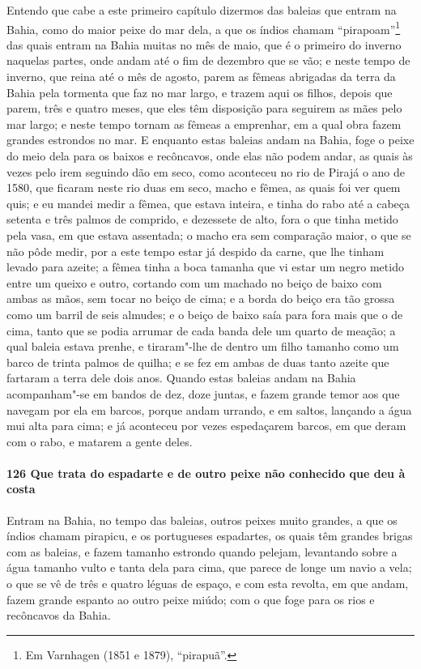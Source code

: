 Entendo que cabe a este primeiro capítulo dizermos das baleias que entram na Bahia, como
do maior peixe do mar dela, a que os índios chamam ``pirapoam''\footnote{ Em Varnhagen
(1851 e 1879), ``pirapuã''.} das quais entram na Bahia muitas no mês de maio, que é o
primeiro do inverno naquelas partes, onde andam até o fim de dezembro que se vão; e neste
tempo de inverno, que reina até o mês de agosto, parem as fêmeas abrigadas da terra da
Bahia pela tormenta que faz no mar largo, e trazem aqui os filhos, depois que parem, três
e quatro meses, que eles têm disposição para seguirem as mães pelo mar largo; e neste
tempo tornam as fêmeas a emprenhar, em a qual obra fazem grandes estrondos no mar. E
enquanto estas baleias andam na Bahia, foge o peixe do meio dela para os baixos e
recôncavos, onde elas não podem andar, as quais às vezes pelo irem seguindo dão em seco,
como aconteceu no rio de Pirajá o ano de 1580, que ficaram neste rio duas em seco, macho e
fêmea, as quais foi ver quem quis; e eu mandei medir a fêmea, que estava inteira, e tinha
do rabo até a cabeça setenta e três palmos de comprido, e dezessete de alto, fora o que
tinha metido pela vasa, em que estava assentada; o macho era sem comparação maior, o que
se não pôde medir, por a este tempo estar já despido da carne, que lhe tinham levado para
azeite; a fêmea tinha a boca tamanha que vi estar um negro metido entre um queixo e outro,
cortando com um machado no beiço de baixo com ambas as mãos, sem tocar no beiço de cima; e
a borda do beiço era tão grossa como um barril de seis almudes; e o beiço de baixo saía
para fora mais que o de cima, tanto que se podia arrumar de cada banda dele um quarto de
meação; a qual baleia estava prenhe, e tiraram"-lhe de dentro um filho tamanho como um
barco de trinta palmos de quilha; e se fez em ambas de duas tanto azeite que fartaram a
terra dele dois anos. Quando estas baleias andam na Bahia acompanham"-se em bandos de dez,
doze juntas, e fazem grande temor aos que navegam por ela em barcos, porque andam urrando,
e em saltos, lançando a água mui alta para cima; e já aconteceu por vezes espedaçarem
barcos, em que deram com o rabo, e matarem a gente deles.

\paragraph{126 Que trata do espadarte e de outro peixe não conhecido que deu à costa}

Entram na Bahia, no tempo das baleias, outros peixes muito grandes, a que os índios chamam
pirapicu, e os portugueses espadartes, os quais têm grandes brigas com as baleias, e fazem
tamanho estrondo quando pelejam, levantando sobre a água tamanho vulto e tanta dela para
cima, que parece de longe um navio a vela; o que se vê de três e quatro léguas de espaço,
e com esta revolta, em que andam, fazem grande espanto ao outro peixe miúdo; com o que
foge para os rios e recôncavos da Bahia.

